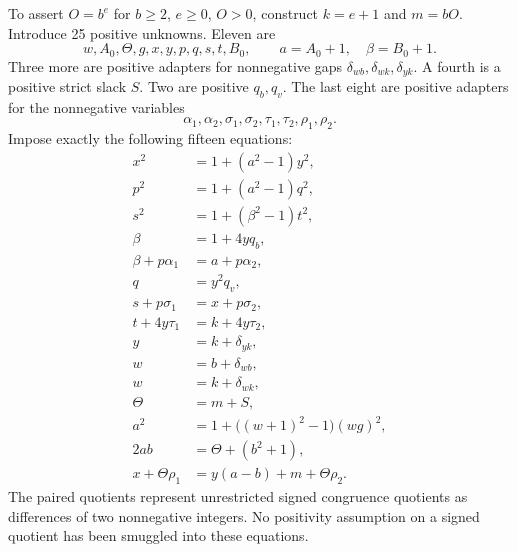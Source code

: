 \documentclass[11pt,letterpaper]{article}
\theoremstyle{definition}\newtheorem{definition}[theorem]{Definition}
\theoremstyle{remark}\newtheorem{remark}[theorem]{Remark}
\begin{document}
To assert $O=b^e$ for $b\ge2$, $e\ge0$, $O>0$, construct $k=e+1$ and $m=bO$. Introduce 25 positive unknowns. Eleven are
\[
 w,A_0,\Theta,g,x,y,p,q,s,t,B_0,
 \qquad a=A_0+1,\quad \beta=B_0+1.
\]
Three more are positive adapters for nonnegative gaps $\delta_{wb},\delta_{wk},\delta_{yk}$. A fourth is a positive strict slack $S$. Two are positive $q_b,q_v$. The last eight are positive adapters for the nonnegative variables
\[
 \alpha_1,\alpha_2,\sigma_1,\sigma_2,
 \tau_1,\tau_2,\rho_1,\rho_2.
\]
Impose exactly the following fifteen equations:
\begin{align}
 x^2&=1+(a^2-1)y^2,\label{ptr:ai:eq:pell1}\\
 p^2&=1+(a^2-1)q^2,\\
 s^2&=1+(\beta^2-1)t^2,\\
 \beta&=1+4yq_b,\\
 \beta+p\alpha_1&=a+p\alpha_2,\\
 q&=y^2q_v,\\
 s+p\sigma_1&=x+p\sigma_2,\\
 t+4y\tau_1&=k+4y\tau_2,\\
 y&=k+\delta_{yk},\label{ptr:ai:eq:pell9}\\
 w&=b+\delta_{wb},\\
 w&=k+\delta_{wk},\\
 \Theta&=m+S,\\
 a^2&=1+\bigl((w+1)^2-1\bigr)(wg)^2,\label{ptr:ai:eq:growthpell}\\
 2ab&=\Theta+(b^2+1),\\
 x+\Theta\rho_1&=y(a-b)+m+\Theta\rho_2.\label{ptr:ai:eq:pell15}
\end{align}
The paired quotients represent unrestricted signed congruence quotients as differences of two nonnegative integers. No positivity assumption on a signed quotient has been smuggled into these equations.
\end{document}

